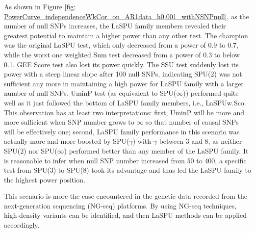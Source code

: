 \documentclass[12pt]{article}
\begin{document}
As shown in Figure \ref{fig: PowerCurve_independenceWkCor_on_AR1data_h0.001_withNSNPnull}, as the number of null SNPs increases, the LaSPU family members revealed their greatest potential to maintain a higher power than any other test. The champion was the original LaSPU test, which only decreased from a power of 0.9 to 0.7, while the worst one weighted Sum test decreased from a power of 0.3 to below 0.1. GEE Score test also lost its power quickly. The SSU test suddenly lost its power with a steep linear slope after 100 null SNPs, indicating SPU(2) was not sufficient any more in maintaining a high power for LaSPU family with a larger number of null SNPs. UminP test (as equivalent to SPU($\infty$)) performed quite well as it just followed the bottom of LaSPU family members, i.e., LaSPUw.Sco. This observation has at least two interpretations: first, UminP will be more and more sufficient when SNP number grows to $\infty$ so that number of causal SNPs will be effectively one; second, LaSPU family performance in this scenario was actually more and more boosted by SPU($\gamma$) with $\gamma$ between 3 and 8, as neither SPU($2$) nor SPU($\infty$) performed better than any member of the LaSPU family. It is reasonable to infer when null SNP number increased from 50 to 400, a specific test from SPU($3$) to SPU($8$) took its advantage and thus led the LaSPU family to the highest power position.

This scenario is more the case encountered in the genetic data recorded from the next-generation sequencing (NG-seq) platforms. By using NG-seq techniques, high-density variants can be identified, and then LaSPU methods can be applied accordingly.
\end{document}
